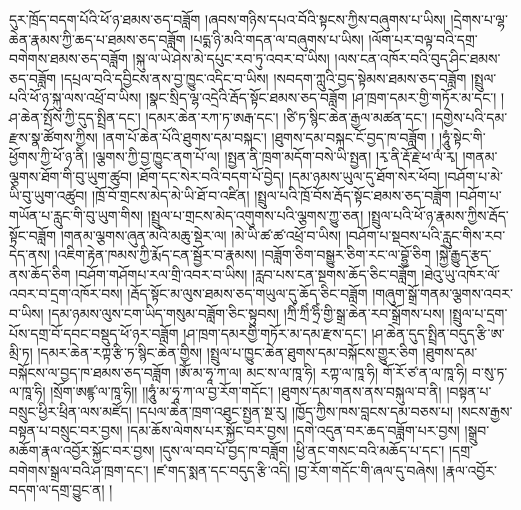 དུར་ཁྲོད་བདག་པོའི་ཕོ་ཉ་ཐམས་ཅད་བཟློག །ཞབས་གཉིས་དཔའ་བོའི་སྟངས་ཀྱིས་བཞུགས་པ་ཡིས། །དྲེགས་པ་ལྷ་ཆེན་རྣམས་ཀྱི་ཆད་པ་ཐམས་ཅད་བཟློག །པདྨ་ཉི་མའི་གདན་ལ་བཞུགས་པ་ཡིས། །ལོག་པར་བལྟ་བའི་དགྲ་བགེགས་ཐམས་ཅད་བཟློག །སྐུ་ལ་ཡེ་ཤེས་མེ་དཔུང་རབ་ཏུ་འབར་བ་ཡིས། །ལས་ངན་འཁོར་བའི་བུད་ཤིང་ཐམས་ཅད་བཟློག །དཔྲལ་བའི་དབྱིངས་ནས་བྱ་ཁྱུང་འདིང་བ་ཡིས། །སབདག་ཀླུའི་བྱད་སྟེམས་ཐམས་ཅད་བཟློག །སྤྲུལ་པའི་ཕོ་ཉ་སྐུ་ལས་འཕྲོ་བ་ཡིས། །སྣང་སྲིད་ལྷ་འདྲེའི་རྦོད་སྟོང་ཐམས་ཅད་བཟློག །ཤ་ཁྲག་དམར་གྱི་གཏོར་མ་དང་། །ཤ་ཆེན་སྤོས་ཀྱི་དུད་སྤྲིན་དང་། །དམར་ཆེན་རཀ་ཏ་ཨརྒ་དང་། །ཙི་ཏ་སྙིང་ཆེན་རྒྱལ་མཚན་དང་། །དགྱེས་པའི་དམ་རྫས་སྣ་ཚོགས་ཀྱིས། །ནག་པོ་ཆེན་པོའི་ཐུགས་དམ་བསྐང་། །ཐུགས་དམ་བསྐང་ངོ་བྱད་ཁ་བཟློག ། །ཧཱུཾ་སྟེང་གི་ཕྱོགས་ཀྱི་ཕོ་ཉ་ནི། །ལྕགས་ཀྱི་བྱ་ཁྱུང་ནག་པོ་ལ། །སྤྱན་ནི་ཁྲག་མདོག་བསེ་ཡི་སྤྱན། །རྭ་ནི་རྡོ་རྗེ་ཕ་ལཾ་རྭ། །གནམ་ལྕགས་ཐོག་གི་བུ་ཡུག་ཚུབ། །ཐོག་དང་སེར་བའི་བདག་པོ་བྱེད། །དམ་ཉམས་ཡུལ་དུ་ཐོག་སེར་ཕོབ། །བཤོག་པ་མེ་ཡི་བུ་ཡུག་འཚུབ། །ཁྲོ་བོ་གྲངས་མེད་མེ་ཡི་ཐོ་བ་འཛིན། །སྤྲུལ་པའི་ཁྲོ་བོས་རྦོད་སྟོང་ཐམས་ཅད་བཟློག །བཤོག་པ་གཡོན་པ་རླུང་གི་བུ་ཡུག་གིས། །སྤྲུལ་པ་གྲངས་མེད་འགུགས་པའི་ལྕགས་ཀྱུ་ཅན། །སྤྲུལ་པའི་ཕོ་ཉ་རྣམས་ཀྱིས་རྦོད་སྟོང་བཟློག །གནམ་ལྕགས་ཞུན་མའི་མཆུ་སྡེར་ལ། །མེ་ཡི་ཚ་ཚ་འཕྲོ་བ་ཡིས། །བཤོག་པ་སྡབས་པའི་རླུང་གིས་རབ་དེད་ནས། །འཇིག་རྟེན་ཁམས་ཀྱི་རྨོད་ངན་སྦྱོར་བ་རྣམས། །བཟློག་ཅིག་བསྒྱུར་ཅིག་རང་ལ་བྷྱོ་ཅིག །སྐྱེ་རྒྱུད་རྩད་ནས་ཆོད་ཅིག །བཤོག་གཤོགཔ་རལ་གྲི་འབར་བ་ཡིས། །རླབ་པས་ངན་སྔགས་ཆོད་ཅིང་བཟློག །ཐེའུ་ཡུ་འཁོར་ལོ་འབར་བ་དྲག་འཁོར་བས། །རྦོད་སྟོང་མ་ལུས་ཐམས་ཅད་གཡུལ་དུ་ཆོད་ཅིང་བཟློག །གཞུག་སྒྲོ་གནམ་ལྕགས་འབར་བ་ཡིས། །དམ་ཉམས་ལུས་ངག་ཡིད་གསུམ་བཟློག་ཅིང་སྟུབས། །ཀྲིཾ་ཀྲིཾ་ཧྲིཾ་གྱི་སྒྲ་ཆེན་རབ་སྒྲོགས་པས། །སྤྲུལ་པ་དྲག་པོས་དགྲ་བོ་དབང་བསྡུད་ཕོ་ཉར་བཟློག །ཤ་ཁྲག་དམརགྱི་གཏོར་མ་དམ་རྫས་དང་། །ཤ་ཆེན་དུད་སྤྲིན་བདུད་རྩི་ཨ་མྲི་ཏ། །དམར་ཆེན་རཀྟ་རྩི་ཏ་སྙིང་ཆེན་གྱིས། །སྤྲུལ་པ་ཁྱུང་ཆེན་ཐུགས་དམ་བསྐོངས་གྱུར་ཅིག །ཐུགས་དམ་བསྐོངས་ལ་བྱད་ཁ་ཐམས་ཅད་བཟློག །ཨོཾ་མ་ཧཱ་ཀ་ལ། མང་ས་ལ་ཁཱ་ཧི། རཀྟ་ལ་ཁཱ་ཧི། གོ་རོ་ཙ་ན་ལ་ཁཱ་ཧི། བ་སུ་ཏ་ལ་ཁཱ་ཧི། །སྲོག་ཨཛྙ་ལ་ཁཱ་ཧི།། །།ཧཱུཾ་མ་ཧཱ་ཀ་ལ་བྱ་རོག་གདོང་། །ཐུགས་དམ་གནས་ནས་བསྐུལ་བ་ནི། །བསྟན་པ་བསྲུང་ཕྱིར་ཕྲིན་ལས་མཛོད། །དཔལ་ཆེན་ཁྲག་འཐུང་སྤྱན་སྔ་རུ། །ཁྱོད་ཀྱིས་ཁས་བླངས་དམ་བཅས་པ། །སངས་རྒྱས་བསྟན་པ་བསྲུང་བར་བྱས། །དམ་ཆོས་ལེགས་པར་སྐྱོང་བར་བྱས། །དགེ་འདུན་བར་ཆད་བཟློག་པར་བྱས། །སྒྲུབ་མཆོག་རྣལ་འབྱོར་སྐྱོང་བར་བྱས། །དུས་ལ་བབ་པོ་བྱད་ཁ་བཟློག །ཕྱི་ནང་གསང་བའི་མཆོད་པ་དང་། །དགྲ་བགེགས་སྒྲལ་བའི་ཤ་ཁྲག་དང་། །ཛ་གད་སྨན་དང་བདུད་རྩི་འདི། །བྱ་རོག་གདོང་གི་ཞལ་དུ་བཞེས། །རྣལ་འབྱོར་བདག་ལ་དགྲ་བྱུང་ན། །

